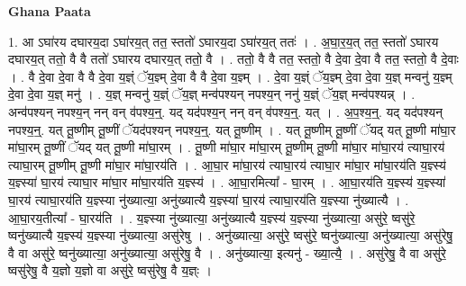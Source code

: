\documentclass[17pt]{extarticle}
\begin{document}
\textbf{Ghana Paata } \newline

1. आ ऽघा॑रय दघारय॒दा ऽघा॑रय॒त् तत॒ स्ततो॑ ऽघारय॒दा ऽघा॑रय॒त् ततः॑ । . अ॒घा॒र॒य॒त् तत॒ स्ततो॑ ऽघारय दघारय॒त् ततो॒ वै वै ततो॑ ऽघारय दघारय॒त् ततो॒ वै । . ततो॒ वै वै तत॒ स्ततो॒ वै दे॒वा दे॒वा वै तत॒ स्ततो॒ वै दे॒वाः । . वै दे॒वा दे॒वा वै वै दे॒वा य॒ज्ञ्ं ॅय॒ज्ञ्म् दे॒वा वै वै दे॒वा य॒ज्ञ्म् । . दे॒वा य॒ज्ञ्ं ॅय॒ज्ञ्म् दे॒वा दे॒वा य॒ज्ञ् मन्वनु॑ य॒ज्ञ्म् दे॒वा दे॒वा य॒ज्ञ् मनु॑ । . य॒ज्ञ् मन्वनु॑ य॒ज्ञ्ं ॅय॒ज्ञ् मन्व॑पश्यन् नपश्य॒न् ननु॑ य॒ज्ञ्ं ॅय॒ज्ञ् मन्व॑पश्यन्न् । . अन्व॑पश्यन् नपश्य॒न् नन् वन् व॑पश्य॒न्॒. यद् यद॑पश्य॒न् नन् वन् व॑पश्य॒न्॒. यत् । . अ॒प॒श्य॒न्॒. यद् यद॑पश्यन् नपश्य॒न्॒. यत् तू॒ष्णीम् तू॒ष्णीं ॅयद॑पश्यन् नपश्य॒न्॒. यत् तू॒ष्णीम् । . यत् तू॒ष्णीम् तू॒ष्णीं ॅयद् यत् तू॒ष्णी मा॑घा॒र मा॑घा॒रम् तू॒ष्णीं ॅयद् यत् तू॒ष्णी मा॑घा॒रम् । . तू॒ष्णी मा॑घा॒र मा॑घा॒रम् तू॒ष्णीम् तू॒ष्णी मा॑घा॒र मा॑घा॒रय॑ त्याघा॒रय॑ त्याघा॒रम् तू॒ष्णीम् तू॒ष्णी मा॑घा॒र मा॑घा॒रय॑ति । . आ॒घा॒र मा॑घा॒रय॑ त्याघा॒रय॑ त्याघा॒र मा॑घा॒र मा॑घा॒रय॑ति य॒ज्ञ्स्य॑ य॒ज्ञ्स्या॑ घा॒रय॑ त्याघा॒र मा॑घा॒र मा॑घा॒रय॑ति य॒ज्ञ्स्य॑ । . आ॒घा॒रमित्या᳚ - घा॒रम् । . आ॒घा॒रय॑ति य॒ज्ञ्स्य॑ य॒ज्ञ्स्या॑ घा॒रय॑ त्याघा॒रय॑ति य॒ज्ञ्स्या नु॑ख्यात्या॒ अनु॑ख्यात्यै य॒ज्ञ्स्या॑ घा॒रय॑ त्याघा॒रय॑ति य॒ज्ञ्स्या नु॑ख्यात्यै । . आ॒घा॒रय॒तीत्या᳚ - घा॒रय॑ति । . य॒ज्ञ्स्या नु॑ख्यात्या॒ अनु॑ख्यात्यै य॒ज्ञ्स्य॑ य॒ज्ञ्स्या नु॑ख्यात्या॒ असु॑रे॒ ष्वसु॑रे॒ ष्वनु॑ख्यात्यै य॒ज्ञ्स्य॑ य॒ज्ञ्स्या नु॑ख्यात्या॒ असु॑रेषु । . अनु॑ख्यात्या॒ असु॑रे॒ ष्वसु॑रे॒ ष्वनु॑ख्यात्या॒ अनु॑ख्यात्या॒ असु॑रेषु॒ वै वा असु॑रे॒ ष्वनु॑ख्यात्या॒ अनु॑ख्यात्या॒ असु॑रेषु॒ वै । . अनु॑ख्यात्या॒ इत्यनु॑ - ख्या॒त्यै॒ । . असु॑रेषु॒ वै वा असु॑रे॒ ष्वसु॑रेषु॒ वै य॒ज्ञो य॒ज्ञो वा असु॑रे॒ ष्वसु॑रेषु॒ वै य॒ज्ञ्ः । \newline
\end{document}

